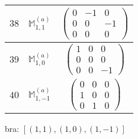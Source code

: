 \documentclass[fleqn,8pt,landscape]{jsarticle}
\begin{document}
\begin{center}
\begin{longtable}{ccc}
$ 38 $ & $ \mathbb{M}_{1,1}^{(a)} $ & $ \begin{pmatrix} 0 & -1 & 0 \\ 0 & 0 & -1 \\ 0 & 0 & 0 \end{pmatrix} $ \\ \hline
$ 39 $ & $ \mathbb{M}_{1,0}^{(a)} $ & $ \begin{pmatrix} 1 & 0 & 0 \\ 0 & 0 & 0 \\ 0 & 0 & -1 \end{pmatrix} $ \\ \hline
$ 40 $ & $ \mathbb{M}_{1,-1}^{(a)} $ & $ \begin{pmatrix} 0 & 0 & 0 \\ 1 & 0 & 0 \\ 0 & 1 & 0 \end{pmatrix} $ \\
\end{longtable}
\end{center}
bra: $[(1,1),(1,0),(1,-1)]$
\end{document}
